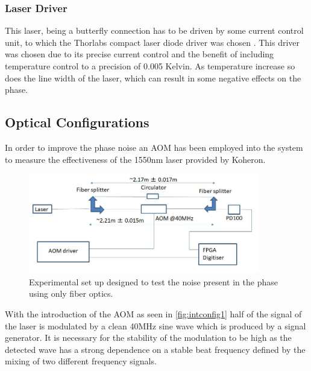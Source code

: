 \documentclass[12pt,a4paper,oneside]{report}
\begin{document}
\subsubsection{Laser Driver}
This laser, being a butterfly connection has to be driven by some current control unit, to which the Thorlabs compact laser diode driver was chosen \cite{CompactPackages}. This driver was chosen due to its precise current control and the benefit of including temperature control to a precision of 0.005 Kelvin. As temperature increase so does the line width of the laser, which can result in some negative effects on the phase.

\subsection{Optical Configurations}
In order to improve the phase noise an AOM has been employed into the system to measure the effectiveness of the 1550nm laser provided by Koheron. 

\begin{figure}[H] 
\includegraphics[width=0.9\textwidth, center,angle=0]{DImages/intconfig1.JPG}
\caption{Experimental set up designed to test the noise present in the phase using only fiber optics.}
\label{fig:intconfig1}
\end{figure}


With the introduction of the AOM \cite{Sell1550MODULATOR} as seen in \autoref{fig:intconfig1} half of the signal of the laser is modulated by a clean 40MHz sine wave which is produced by a signal generator. It is necessary for the stability of the modulation to be high as the detected wave has a strong dependence on a stable beat frequency defined by the mixing of two different frequency signals.
\end{document}
